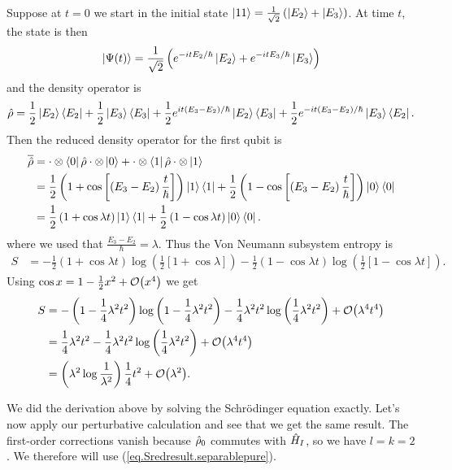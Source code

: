 Suppose at \(t=0\) we start in the initial state \(\left|11\right\rangle = \frac{1}{\sqrt{2}}\left(\left|E_2\right\rangle+\left|E_3\right\rangle\right)\). At time \(t\), the state is then
\[
\left|\Psi(t)\right\rangle = \frac{1}{\sqrt{2}}\left(e^{-itE_2/\hbar}\left|E_2\right\rangle + e^{-itE_3/\hbar} \left|E_3\right\rangle\right)
\]
and the density operator is
\[
\hat{\rho} = \frac{1}{2}\left|E_2\right\rangle\left\langle E_2\right| + \frac{1}{2}\left|E_3\right\rangle\left\langle E_3\right| + \frac{1}{2} e^{it\left(E_3-E_2\right)/\hbar} \left|E_2\right\rangle\left\langle E_3\right| + \frac{1}{2} e^{-it\left(E_3 - E_2\right)/\hbar} \left|E_3\right\rangle\left\langle E_2\right|.
\]
Then the reduced density operator for the first qubit is
\begin{align*}
\overline{\hat{\rho}} &= \cdot\otimes\left\langle0\right| \hat{\rho} \cdot\otimes\left|0\right\rangle + \cdot\otimes\left\langle1\right| \hat{\rho} \cdot\otimes\left|1\right\rangle \\
&= \frac{1}{2}\left(1 + \cos \left[\left(E_3-E_2\right)\frac{t}{\hbar}\right] \right)\left|1\right\rangle\left\langle1\right| + \frac{1}{2}\left(1 -\cos \left[\left(E_3-E_2\right)\frac{t}{\hbar}\right] \right)\left|0\right\rangle\left\langle0\right| \\
&= \frac{1}{2}\left(1 + \cos \lambda t \right)\left|1\right\rangle\left\langle1\right| + \frac{1}{2}\left(1 -\cos \lambda t \right)\left|0\right\rangle\left\langle0\right|.
\end{align*}
where we used that \(\frac{E_3-E_2}{\hbar} = \lambda\). Thus the Von Neumann subsystem entropy is
\begin{align*}
S &= -\frac{1}{2}\left(1 + \cos \lambda t \right)\log \left(\frac{1}{2}\left[1+\cos \lambda\right]\right)
- \frac{1}{2}\left(1 - \cos \lambda t \right)\log \left(\frac{1}{2}\left[1-\cos\lambda t\right]\right).
\end{align*}
Using \(\cos x = 1-\frac{1}{2} x^2 + \mathcal{O}{\left(x^4\right)}\) we get
\begin{align*}
S &=- \left(1-\frac{1}{4}\lambda^2 t^2\right) \log \left(1-\frac{1}{4}\lambda^2 t^2\right) - \frac{1}{4}\lambda^2 t^2 \log \left(\frac{1}{4}\lambda^2 t^2\right) + \mathcal{O}{\left(\lambda^4 t^4\right)}\\
&=\frac{1}{4}\lambda^2 t^2 - \frac{1}{4}\lambda^2 t^2 \log \left(\frac{1}{4}\lambda^2 t^2\right) + \mathcal{O}{\left(\lambda^4 t^4\right)}\\
&= \left(\lambda^2 \log \frac{1}{\lambda^2}\right) \frac{1}{4} t^2 + \mathcal{O}{\left(\lambda^2\right)}.
\end{align*}

We did the derivation above by solving the Schr\"odinger equation exactly. Let's now apply our perturbative calculation and see that we get the same result. 
The first-order corrections vanish because \(\hat{\rho}_0\) commutes with \(\hat{H}_I\), so we have \(l=k=2\). We therefore will use (\ref{eq.Sredresult.separablepure}).


